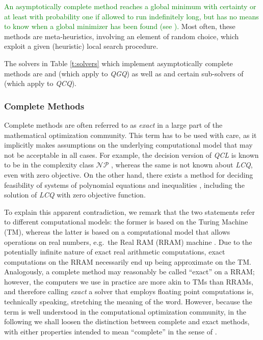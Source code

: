 \textcolor{green}{An asymptotically complete method reaches a global minimum with certainty or
at least with probability one if allowed to run indefinitely long, but has no means to know when a global minimizer has been found (see \cite{neumaier}).}
%
%
Most often, these methods are meta-heuristics, involving an element of random choice, which exploit a given (heuristic) local search procedure.

The solvers in Table \ref{t:solvers} which implement asymptotically complete methods are \oqnlp and \knitro (which apply to \textit{QGQ}) as well as \msnlp and certain sub-solvers of \lgo (which apply to \textit{QCQ}).


\subsubsection{Complete Methods}\label{s:complete}

Complete methods are often referred to as \emph{exact} in a large part of the mathematical optimization community. This term has to be used with care, as it implicitly makes assumptions on the underlying computational model that may not be acceptable in all cases. For example, the decision version of \textit{QCL} is known to be in the complexity class $\mathcal{NP}$ \cite{vavasis90a}, whereas the same is not known about \textit{LCQ}, even with zero objective. On the other hand, there exists a method for deciding feasibility of systems of polynomial equations and inequalities \cite{tarski-reals}, including the solution of \textit{LCQ} with zero objective function.

To explain this apparent contradiction, we remark that the two statements refer to different computational models: the former is based on the Turing Machine (TM), whereas the latter is based on a computational model that allows operations on real numbers, e.g.~the Real RAM (RRAM) machine \cite{blum}. Due to the potentially infinite nature of exact real arithmetic computations, exact computations on the RRAM necessarily end up being approximate on the TM. Analogously, a complete method may reasonably be called ``exact'' on a RRAM; however, the computers we use in practice are more akin to TMs than RRAMs, and therefore calling \emph{exact} a solver that employs floating point computations is, technically speaking, stretching the meaning of the word. However, because the term is well understood in the computational optimization community, in the following we shall loosen the distinction between complete and exact methods, with either properties intended to mean ``complete'' in the sense of \cite{neumaier}.

